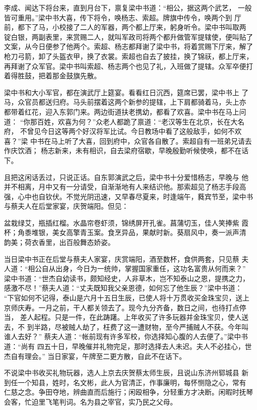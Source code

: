 李成、闻达下将台来，直到月台下，禀复梁中书道：“相公，据这两个武艺，
一般皆可重用。”梁中书大喜，传下将令，唤杨志、索超。牌旗中传令，唤两个到
厅前，都下了马，小校接了二人的军器，两个都上厅来，躬身听令。梁中书叫取两
锭白银，两副表里，来赏赐二人，就叫军政司将两个都升做管军提辖使，便叫贴了
文案，从今日便参了他两个。索超、杨志都拜谢了梁中书，将着赏赐下厅来，解了
枪刀弓箭，卸了头盔衣甲，换了衣裳。索超也自去了披挂，换了锦祆，都上厅来，
再拜谢了众军官。梁中书叫索超、杨志两个也见了礼，入班做了提辖。众军卒便打
着得胜鼓，把着那金鼓旗先散。

梁中书和大小军官，都在演武厅上筵宴。看看红日沉西，筵席已罢，梁中书上
了马，众官员都送归府。马头前摆着这两个新参的提辖，上下肩都骑着马，头上亦
都带着红花，迎入东郭门来。两边街道扶老携幼，都看了欢喜。梁中书在马上问道：
“你那百姓，欢喜为何？”众老人都跪了禀道：“老汉等生在北京，长在大名府，
不曾见今日这等两个好汉将军比试。今日教场中看了这般敌手，如何不欢喜？”梁
中书在马上听了大喜，回到府中，众官各自散了。索超自有一班弟兄请去作庆饮酒；
杨志新来，未有相识，自去梁府宿歇，早晚殷勤听候使唤，都不在话下。

且把这闲话丢过，只说正话。自东郭演武之后，梁中书十分爱惜杨志，早晚与
他并不相离，月中又有一分请受，自渐渐地有人来结识他。那索超见了杨志手段高
强，心中也自钦伏。不觉光阴迅速，又早春尽夏来，时逢端午，蕤宾节至，梁中书
与蔡夫人在后堂家宴，庆贺端阳。但见：

盆栽绿艾，瓶插红榴。水晶帘卷虾须，锦绣屏开孔雀。菖蒲切玉，佳人笑捧紫
霞杯；角黍堆银，美女高擎青玉案。食烹异品，果献时新。葵扇风中，奏一派声清
韵美；荷衣香里，出百般舞态娇姿。

当日梁中书正在后堂与蔡夫人家宴，庆赏端阳，酒至数杯，食供两套，只见蔡
夫人道：“相公自从出身，今日为一统帅，掌握国家重任，这功名富贵从何而来？”
梁中书道：“世杰自幼读书，颇知经史，人非草木，岂不知泰山之恩，提携之力，
感激不尽！”蔡夫人道：“丈夫既知我父亲恩德，如何忘了他生辰？”梁中书道：
“下官如何不记得，泰山是六月十五日生辰，已使人将十万贯收买金珠宝贝，送上
京师庆寿。一月之前，干人都关领去了。现今九分齐备，数日之间，也待打点停当，
差人起程。只是一件，在此踌躇。上年收买了许多玩器并金珠宝贝，使人送去，不
到半路，尽被贼人劫了，枉费了这一遭财物，至今严捕贼人不获。今年叫谁人去好？”
蔡夫人道：“帐前现有许多军校，你选择知心腹的人去便了。”梁中书道：“尚有
四五十日，早晚催并礼物完足，那时选择去人未迟。夫人不必挂心，世杰自有理会。”
当日家宴，午牌至二更方散，自此不在话下。

不说梁中书收买礼物玩器，选人上京去庆贺蔡太师生辰，且说山东济州郓城县
新到任一个知县，姓时，名文彬，此人为官清正，作事廉明，每怀恻隐之心，常有
仁慈之念。争田夺地，辨曲直而后施行；闲殴相争，分轻重方才决断。闲暇时抚琴
会客，忙迫里飞笔判词。名为县之宰官，实乃民之父母。

